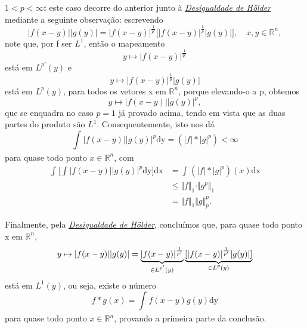 \documentclass[../distribution_theory_notes.tex]{subfiles}
\begin{document}
\begin{proof*}
	\textbf{\underline{\(1<p<\infty\)}:} este caso decorre do anterior junto à \hyperlink{holder_inequality}{\textit{Desigualdade de Hölder}} mediante a seguinte observação: escrevendo
	\[
		|f(x-y)| |g(y)| = |f(x-y)|^{\frac{1}{p'}}\bigl[|f(x-y)|^{\frac{1}{p}} |g(y)|\bigr],\quad x, y\in \mathbb{R}^{n},
	\]
	note que, por f ser \(L^{1}\), então o mapeamento
	\[
		y\mapsto |f(x-y)|^{\frac{1}{p'}}
	\]
	está em \(L^{p'}(y)\) e
	\[
		y\mapsto |f(x-y)|^{\frac{1}{p}}|g(y)|
	\]
	está em \(L^{p}(y)\), para todos os vetores x em \(\mathbb{R}^{n}\), porque elevando-o a p, obtemos
	\[
		y\mapsto |f(x-y)||g(y)|^{p},
	\]
	que se enquadra no caso \(p=1\) já provado acima, tendo em vista que as duas partes do produto são \(L^{1}\). Consequentemente, isto nos dá
	\[
		\int_{}^{}|f(x-y)||g(y)|^{p} \mathrm{dy} = (|f|*|g|^{p}) < \infty
	\]
	para quase todo ponto \(x\in \mathbb{R}^{n}\), com
	\begin{align*}
		\int_{}^{}\biggl[\int_{}^{}|f(x-y)||g(y)|^{p} \mathrm{dy}\biggr] \mathrm{dx} & = \int_{}^{}(|f|*|g|^{p})(x) \mathrm{dx}       \\
		                                                                             & \leq \Vert f \Vert_1 \cdot \Vert g^{p} \Vert_1 \\
		                                                                             & = \Vert f \Vert_1 \Vert g \Vert_{p}^{p}.
	\end{align*}

	Finalmente, pela \hyperlink{holder_inequality}{\textit{Desigualdade de Hölder}}, concluímos que, para quase todo ponto x em \(\mathbb{R}^{n}\),
	\[
		y\mapsto |f(x-y)||g(y)| = \underbrace{|f(x-y)|^{\frac{1}{p'}}}_{\mathclap{\in L^{p'}(y)}}\underbrace{[|f(x-y)|^{\frac{1}{p'}}|g(y)|]}_{\mathclap{\in L^{p}(y)}}
	\]
	está em \(L^{1}(y)\), ou seja, existe o número
	\[
		f*g(x) = \int_{}^{}f(x-y)g(y) \mathrm{dy}
	\]
	para quase todo ponto \(x\in \mathbb{R}^{n}\), provando a primeira parte da conclusão.


\end{proof*}
\end{document}
